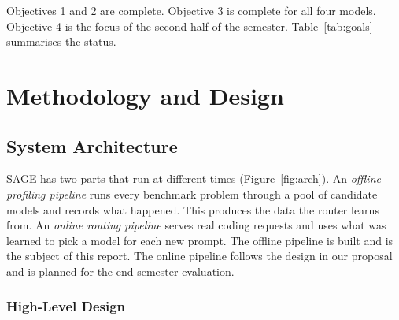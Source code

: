 Objectives 1 and 2 are complete. Objective 3 is complete for all four models. Objective 4 is the focus of the second half of the semester. Table~\ref{tab:goals} summarises the status.

\chapter{Methodology and Design}

\section{System Architecture}

SAGE has two parts that run at different times (Figure~\ref{fig:arch}). An \emph{offline profiling pipeline} runs every benchmark problem through a pool of candidate models and records what happened. This produces the data the router learns from. An \emph{online routing pipeline} serves real coding requests and uses what was learned to pick a model for each new prompt. The offline pipeline is built and is the subject of this report. The online pipeline follows the design in our proposal and is planned for the end-semester evaluation.

\subsection{High-Level Design}

